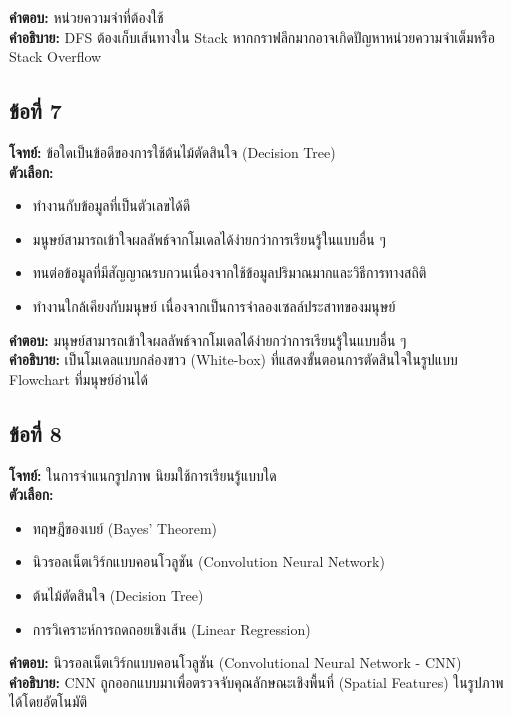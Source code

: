 \documentclass[12pt]{article}
\begin{document}
\textbf{คำตอบ:} หน่วยความจำที่ต้องใช้\\
\textbf{คำอธิบาย:} DFS ต้องเก็บเส้นทางใน Stack หากกราฟลึกมากอาจเกิดปัญหาหน่วยความจำเต็มหรือ Stack Overflow

\subsection*{ข้อที่ 7}
\textbf{โจทย์:} ข้อใดเป็นข้อดีของการใช้ต้นไม้ตัดสินใจ (Decision Tree)\\
\textbf{ตัวเลือก:}
\begin{itemize}
    \item ทำงานกับข้อมูลที่เป็นตัวเลขได้ดี
    \item มนูษย์สามารถเข้าใจผลลัพธ์จากโมเดลได้ง่ายกว่าการเรียนรู้ในแบบอื่น ๆ
    \item ทนต่อข้อมูลที่มีสัญญาณรบกวนเนื่องจากใช้ข้อมูลปริมาณมากและวิธีการทางสถิติ
    \item ทำงานใกล้เคียงกับมนุษย์ เนื่องจากเป็นการจำลองเซลล์ประสาทของมนุษย์
\end{itemize}

\textbf{คำตอบ:} มนุษย์สามารถเข้าใจผลลัพธ์จากโมเดลได้ง่ายกว่าการเรียนรู้ในแบบอื่น ๆ\\
\textbf{คำอธิบาย:} เป็นโมเดลแบบกล่องขาว (White-box) ที่แสดงขั้นตอนการตัดสินใจในรูปแบบ Flowchart ที่มนุษย์อ่านได้

\subsection*{ข้อที่ 8}
\textbf{โจทย์:} ในการจำแนกรูปภาพ นิยมใช้การเรียนรู้แบบใด\\
\textbf{ตัวเลือก:}
\begin{itemize}
    \item ทฤษฎีของเบย์ (Bayes’ Theorem)
    \item นิวรอลเน็ตเวิร์กแบบคอนโวลูชัน (Convolution Neural Network)
    \item ต้นไม้ตัดสินใจ (Decision Tree)
    \item การวิเคราะห์การถดถอยเชิงเส้น (Linear Regression)
\end{itemize}

\textbf{คำตอบ:} นิวรอลเน็ตเวิร์กแบบคอนโวลูชัน (Convolutional Neural Network - CNN)\\
\textbf{คำอธิบาย:} CNN ถูกออกแบบมาเพื่อตรวจจับคุณลักษณะเชิงพื้นที่ (Spatial Features) ในรูปภาพได้โดยอัตโนมัติ
\end{document}
